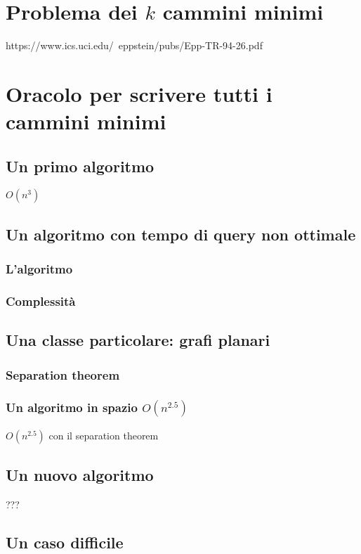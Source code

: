 \documentclass[a4paper,10pt]{amsbook}
\theoremstyle{plain}
\theoremstyle{definition}
\theoremstyle{remark}
\begin{document}
\chapter{Problema dei $k$ cammini minimi}

https://www.ics.uci.edu/~eppstein/pubs/Epp-TR-94-26.pdf

\chapter{Oracolo per scrivere tutti i cammini minimi}
\label{chap:oracolotutticammini}

\section{Un primo algoritmo}

$O(n^3)$

\section{Un algoritmo con tempo di query non ottimale}

\subsection{L'algoritmo}

\subsection{Complessità}

\section{Una classe particolare: grafi planari}

\subsection{Separation theorem}

\subsection{Un algoritmo in spazio $O(n^{2.5})$}

$O(n^{2.5})$ con il separation theorem

\section{Un nuovo algoritmo}

???

\section{Un caso difficile}





\end{document}
